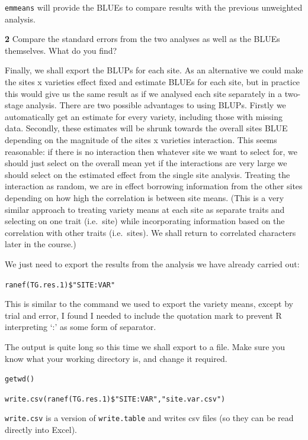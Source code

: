 \documentclass[
]{book}
\makeatletter
\newenvironment{kframe}{%
\medskip{}
\setlength{\fboxsep}{.8em}
 \def\at@end@of@kframe{}%
 \ifinner\ifhmode%
  \def\at@end@of@kframe{\end{minipage}}%
  \begin{minipage}{\columnwidth}%
 \fi\fi%
 \def\FrameCommand##1{\hskip\@totalleftmargin \hskip-\fboxsep
 \colorbox{shadecolor}{##1}\hskip-\fboxsep
     \hskip-\linewidth \hskip-\@totalleftmargin \hskip\columnwidth}%
 \MakeFramed {\advance\hsize-\width
   \@totalleftmargin\z@ \linewidth\hsize
   \@setminipage}}%
 {\par\unskip\endMakeFramed%
 \at@end@of@kframe}
\newenvironment{rmdblock}[1]
  {
  \begin{itemize}
  \renewcommand{\labelitemi}{
    \raisebox{-.7\height}[0pt][0pt]{
      {\setkeys{Gin}{width=3em,keepaspectratio}\texttt{[image: images/\#1]}}
    }
  }
  \setlength{\fboxsep}{1em}
  \begin{kframe}
  \item
  }
  {
  \end{kframe}
  \end{itemize}
  }
\newenvironment{rmdquiz}
  {\begin{rmdblock}{quiz}}
  {\end{rmdblock}}
\makeatother
\begin{document}
\texttt{emmeans} will provide the BLUEs to compare results with the previous unweighted analysis.

\begin{rmdquiz}
\textbf{2} Compare the standard errors from the two analyses as well as the BLUEs themselves. What do you find?
\end{rmdquiz}

Finally, we shall export the BLUPs for each site. As an alternative we could make the sites x varieties effect fixed and estimate BLUEs for each site, but in practice this would give us the same result as if we analysed each site separately in a two-stage analysis. There are two possible advantages to using BLUPs. Firstly we automatically get an estimate for every variety, including those with missing data. Secondly, these estimates will be shrunk towards the overall sites BLUE depending on the magnitude of the sites x varieties interaction. This seems reasonable: if there is no interaction then whatever site we want to select for, we should just select on the overall mean yet if the interactions are very large we should select on the estimated effect from the single site analysis. Treating the interaction as random, we are in effect borrowing information from the other sites depending on how high the correlation is between site means. (This is a very similar approach to treating variety means at each site as separate traits and selecting on one trait (i.e.~site) while incorporating information based on the correlation with other traits (i.e.~sites). We shall return to correlated characters later in the course.)

We just need to export the results from the analysis we have already carried out:

\texttt{ranef(TG.res.1)\$"SITE:VAR"}

This is similar to the command we used to export the variety means, except by trial and error, I found I needed to include the quotation mark to prevent R interpreting `:' as some form of separator.

The output is quite long so this time we shall export to a file. Make sure you know what your working directory is, and change it required.

\texttt{getwd()}

\texttt{write.csv(ranef(TG.res.1)\$"SITE:VAR","site.var.csv")}

\texttt{write.csv} is a version of \texttt{write.table} and writes csv files (so they can be read directly into Excel).
\end{document}
